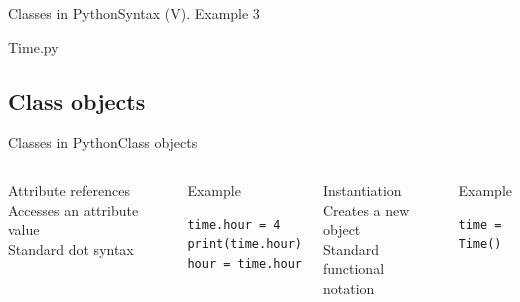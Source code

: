 \documentclass[10pt,compress]{beamer} %
\begin{document}
\begin{frame}{Classes in Python}{Syntax (V). Example 3}
	\vspace{-0.2cm}
	\begin{block}{Time.py}
	\vspace{-0.3cm}
		
	\vspace{-0.3cm} 
	\end{block}
\end{frame}

\subsection{Class objects}
\begin{frame}[fragile]{Classes in Python}{Class objects}
    \begin{columns}
	   		\begin{block}{Attribute references}
			Accesses an attribute value\\
			Standard dot syntax\\
			\bigskip
			\\
	   		\end{block}
	   		\begin{exampleblock}{Example}
\begin{verbatim}
time.hour = 4
print(time.hour)
hour = time.hour
\end{verbatim}
	   		\end{exampleblock}

	   		\begin{block}{Instantiation}
			Creates a new object\\
			Standard functional notation\\
			\bigskip
			\\
	   		\end{block}
	   		\begin{exampleblock}{Example}
\begin{verbatim}
time = Time()
\end{verbatim}
	   		\end{exampleblock}
	\end{columns}
\end{frame}
\end{document}
